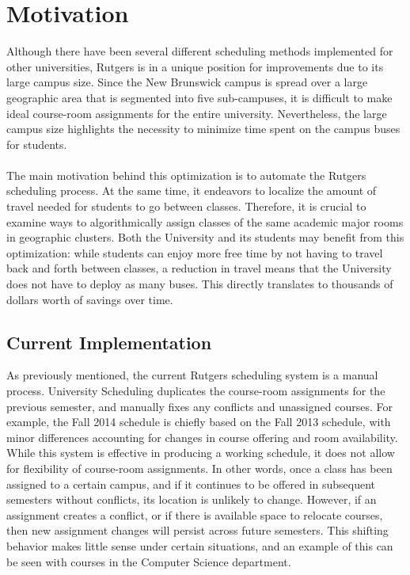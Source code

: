 \documentclass[12pt]{article}
\begin{document}
\section{Motivation}
Although there have been several different scheduling methods implemented for other universities, Rutgers is in a unique position for improvements due to its large campus size. Since the New Brunswick campus is spread over a large geographic area that is segmented into five sub-campuses, it is difficult to make ideal course-room assignments for the entire university. Nevertheless, the large campus size highlights the necessity to minimize time spent on the campus buses for students. 
\\\\
The main motivation behind this optimization is to automate the Rutgers scheduling process. At the same time, it endeavors to localize the amount of travel needed for students to go between classes. Therefore, it is crucial to examine ways to algorithmically assign classes of the same academic major rooms in geographic clusters. Both the University and its students may benefit from this optimization: while students can enjoy more free time by not having to travel back and forth between classes, a reduction in travel means that the University does not have to deploy as many buses. This directly translates to thousands of dollars worth of savings over time. 

\subsection{Current Implementation}
As previously mentioned, the current Rutgers scheduling system is a manual process. University Scheduling duplicates the course-room assignments for the previous semester, and manually fixes any conflicts and unassigned courses. For example, the Fall 2014 schedule is chiefly based on the Fall 2013 schedule, with minor differences accounting for changes in course offering and room availability. While this system is effective in producing a working schedule, it does not allow for flexibility of course-room assignments. In other words, once a class has been assigned to a certain campus, and if it continues to be offered in subsequent semesters without conflicts, its location is unlikely to change. However, if an assignment creates a conflict, or if there is available space to relocate courses, then new assignment changes will persist across future semesters. This shifting behavior makes little sense under certain situations, and an example of this can be seen with courses in the Computer Science department. 
\end{document}
